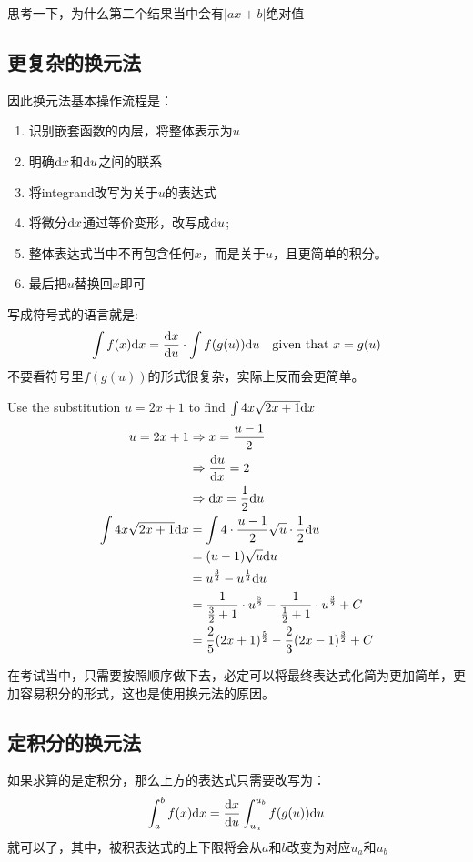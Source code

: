 \begin{TaskBox}
思考一下，为什么第二个结果当中会有$|ax+b|$绝对值
\end{TaskBox}


\subsection*{更复杂的换元法}
因此换元法基本操作流程是：
\begin{enumerate}
	\item 识别嵌套函数的内层，将整体表示为$u$
	\item 明确${\mathrm{d}} x$和${\mathrm{d}} u$之间的联系
	\item 将integrand改写为关于$u$的表达式
	\item 将微分${\mathrm{d}} x$通过等价变形，改写成${\mathrm{d}} u$;
	\item 整体表达式当中不再包含任何$x$，而是关于$u$，且更简单的积分。
	\item 最后把$u$替换回$x$即可
\end{enumerate}

写成符号式的语言就是:
\[
	\int f(x) {\mathrm{d}} x =\frac{{\mathrm{d}} x}{{\mathrm{d}} u} \cdot \int f(g(u))  {\mathrm{d}} u \quad  \text{given that }x=g(u)
\]
不要看符号里$f(g(u))$的形式很复杂，实际上反而会更简单。

\begin{ExampleBox}
Use the substitution $u=2x+1$ to find $\int 4x\sqrt{2x+1} {\mathrm{d}} x$
\tcblower
\begin{align*}
 u=2x+1 &\Rightarrow x=\frac{u-1}{2}\\
        &\Rightarrow \frac{{\mathrm{d}} u}{{\mathrm{d}} x}=2\\
        &\Rightarrow {\mathrm{d}} x= \frac{1}{2} {\mathrm{d}} u\\
 \int 4x\sqrt{2x+1} {\mathrm{d}} x &=\int 4\cdot \frac{u-1}{2}\sqrt{u} \cdot \frac{1}{2} {\mathrm{d}} u\\
        &=(u-1)\sqrt u {\mathrm{d}} u\\
        &=u^{\frac{3}{2}} -u^{\frac{1}{2}} {\mathrm{d}} u\\
        &=\frac{1}{\frac{3}{2}+1}\cdot u^{\frac{5}{2}}-\frac{1}{\frac{1}{2}+1}\cdot u^{\frac{3}{2}}+C\\
        &=\frac{2}{5}(2x+1)^{\frac{5}{2}}-\frac{2}{3}(2x-1)^{\frac{3}{2}}+C
\end{align*}
\end{ExampleBox}
在考试当中，只需要按照顺序做下去，必定可以将最终表达式化简为更加简单，更加容易积分的形式，这也是使用换元法的原因。

\subsection*{定积分的换元法}
如果求算的是定积分，那么上方的表达式只需要改写为：
\[
	\int_a^b f(x) {\mathrm{d}} x =\frac{{\mathrm{d}} x}{{\mathrm{d}} u}\int_{u_a}^{u_b} f(g(u)) {\mathrm{d}} u
\]
就可以了，其中，被积表达式的上下限将会从$a$和$b$改变为对应$u_a$和$u_b$

